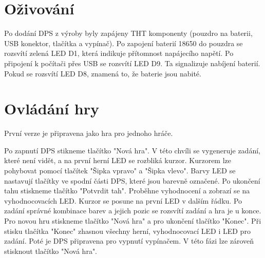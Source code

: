 \chapter{Oživování}
Po dodání DPS z výroby byly zapájeny THT komponenty (pouzdro na baterii, USB konektor, tlačítka a vypínač). Po zapojení baterií
18650 do pouzdra se rozsvítí zelená LED D1, která indikuje přítomnost napájecího napětí. Po připojení k počítači přes USB
se rozsvítí LED D9. Ta signalizuje nabíjení baterií. Pokud se rozsvítí LED D8, znamená to, že baterie jsou nabité.


\chapter{Ovládání hry}
První verze je připravena jako hra pro jednoho hráče.

Po zapnutí DPS stikneme tlačítko "Nová hra". V této chvíli se vygeneruje zadání, které není vidět,
 a na první herní LED se rozbliká kurzor. 
Kurzorem lze pohybovat pomocí tlačítek "Šipka vpravo" a "Šipka vlevo". Barvy LED se nastavují tlačítky ve spodní části DPS,
které jsou barevně označené. 
Po ukončení tahu stiskneme tlačítko "Potvrdit tah". Proběhne vyhodnocení a zobrazí se na vyhodnocovacích LED. Kurzor se posune
na první LED v dalším řádku.
Po zadání správné kombinace barev a jejich pozic se rozsvítí zadání a hra je u konce. Pro novou hru stiskneme tlačítko
"Nová hra" a pro ukončení tlačítko "Konec".
Při stisku tlačítka "Konec" zhasnou všechny herní, vyhodnocovací LED i LED pro zadání. Poté je DPS připravena pro vypnutí
vypínačem. V této fázi lze zároveň stisknout tlačítko "Nová hra".